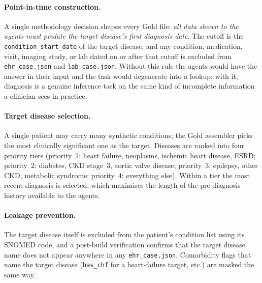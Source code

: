 \paragraph{Point-in-time construction.} A single methodology decision
shapes every Gold file: \emph{all data shown to the agents must
predate the target disease's first diagnosis date}. The cutoff is
the \texttt{condition\_start\_date} of the target disease, and any
condition, medication, visit, imaging study, or lab dated on or
after that cutoff is excluded from \texttt{ehr\_case.json} and
\texttt{lab\_case.json}. Without this rule the agents would have the
answer in their input and the task would degenerate into a lookup;
with it, diagnosis is a genuine inference task on the same kind of
incomplete information a clinician sees in practice.

\paragraph{Target disease selection.} A single patient may carry many
synthetic conditions; the Gold assembler picks the most clinically
significant one as the target. Diseases are ranked into four
priority tiers (priority~1: heart failure, neoplasms, ischemic heart
disease, ESRD; priority~2: diabetes, CKD stage~3, aortic valve
disease; priority~3: epilepsy, other CKD, metabolic syndrome;
priority~4: everything else). Within a tier the most recent
diagnosis is selected, which maximises the length of the
pre-diagnosis history available to the agents.

\paragraph{Leakage prevention.} The target disease itself is excluded
from the patient's condition list using its SNOMED code, and a
post-build verification confirms that the target disease name does
not appear anywhere in any \texttt{ehr\_case.json}. Comorbidity
flags that name the target disease (\texttt{has\_chf} for a
heart-failure target, etc.) are masked the same way.


